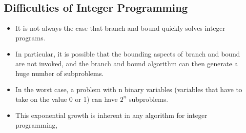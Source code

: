 \documentclass{beamer}
\begin{document}
\subsection{Difficulties of Integer Programming}
\begin{frame}
	\begin{itemize}
		\item It is not always the case that branch and bound quickly
		solves integer programs.
		
		\item In particular, it is possible that the bounding aspects
		of branch and bound are not invoked, and the branch and bound algorithm can
		then generate a huge number of subproblems. 
		\item In the worst case, a problem
		with n binary variables (variables that have to take on the value 0 or 1) can
		have $2^n$ subproblems. 
		\item This exponential growth is inherent in any algorithm for
		integer programming, 
	\end{itemize}
	
\end{frame}
\end{document}

